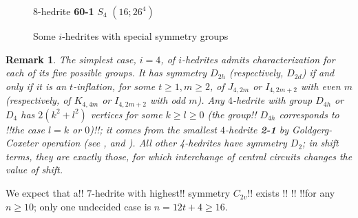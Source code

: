 \documentclass[12pt]{article}
\newtheorem{remark}{Remark}
\begin{document}
\begin{remark!!}
\begin{figure}
{%
\begin{minipage}[t]{4cm}
\centering
\epsfxsize=4cm
\par
{$8$-hedrite {\bf 60-1} $S_4$ $(16;26^4)$}
\end{minipage}
}
\caption{Some $i$-hedrites with special symmetry groups}
\label{special-i-hedrites}
\end{figure}








\begin{remark}
The simplest case, $i=4$, of $i$-hedrites admits characterization for each of
its five possible groups.
It has symmetry $D_{2h}$  (respectively, $D_{2d}$) if and only if it is an
$t$-inflation, for some $t \ge 1, m \ge 2$, of $J_{4,2m}$ or $I_{4,2m+2}$ with
even $m$ (respectively, of $K_{4,4m}$ or $I_{4,2m+2}$ with odd $m$).
Any $4$-hedrite with group $D_{4h}$ or $D_4$ has $2(k^2+l^2)$ vertices for some
$k \ge l \ge 0$ (the group!! $D_{4h}$ corresponds to 
!!the case $l=k$ or $0$)!!; it comes from the
smallest $4$-hedrite {\bf 2-1} by Goldgerg-Coxeter operation (see \cite{Gold37}, \cite{Cox71} and \cite{DD03}).
All other 4-hedrites have symmetry $D_2$; in shift terms, they are exactly those, for which interchange of central circuits changes the value of shift.
\end{remark}

We expect that a!! $7$-hedrite with highest!! symmetry $C_{2v}$!! exists 
!!%
!!%
!!for any $n \ge 10$; only one undecided case is $n=12t+4 \ge 16$.





\end{remark!!}
\end{document}
